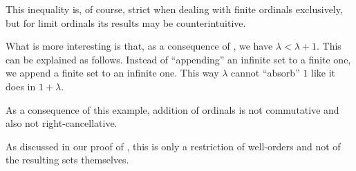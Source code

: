 \begin{example}
  This inequality is, of course, strict when dealing with finite ordinals exclusively, but for limit ordinals its results may be counterintuitive.

  What is more interesting is that, as a consequence of , we have \( \lambda < \lambda + 1 \). This can be explained as follows. Instead of \enquote{appending} an infinite set to a finite one, we append a finite set to an infinite one. This way \( \lambda \) cannot \enquote{absorb} \( 1 \) like it does in \( 1 + \lambda \).

  As a consequence of this example, addition of ordinals is not commutative and also not right-cancellative.

  As discussed in our proof of , this is only a restriction of well-orders and not of the resulting sets themselves.
\end{example}

